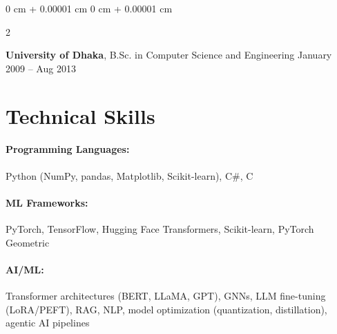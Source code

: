 \documentclass[10pt, letterpaper]{article}
\newenvironment{onecolentry}{
    \begin{adjustwidth}{
        0 cm + 0.00001 cm
    }{
        0 cm + 0.00001 cm
    }
}{
    \end{adjustwidth}
} %
\newenvironment{twocolentry}[2][]{
    \onecolentry
    \def\secondColumn{#2}
    \setcolumnwidth{\fill, 4.5 cm}
    \begin{paracol}{2}
}{
    \switchcolumn \raggedleft \secondColumn
    \end{paracol}
    \endonecolentry
} %
\begin{document}
        \begin{twocolentry}{
            January 2009 – Aug 2013
        }
            \textbf{University of Dhaka}, B.Sc. in Computer Science and Engineering\end{twocolentry}
    
        




\vspace{-1mm}
\section{Technical Skills}

        \paragraph{Programming Languages:} Python (NumPy, pandas, Matplotlib, Scikit-learn), C\#, C
        \vspace{-4mm}
        \paragraph{ML Frameworks:} PyTorch, TensorFlow, Hugging Face Transformers, Scikit-learn, PyTorch Geometric
        \vspace{-4mm}
        \paragraph{AI/ML:} Transformer architectures (BERT, LLaMA, GPT), GNNs, LLM fine-tuning (LoRA/PEFT), RAG, NLP, model optimization (quantization, distillation), agentic AI pipelines
        \vspace{-4mm}
\end{document}
